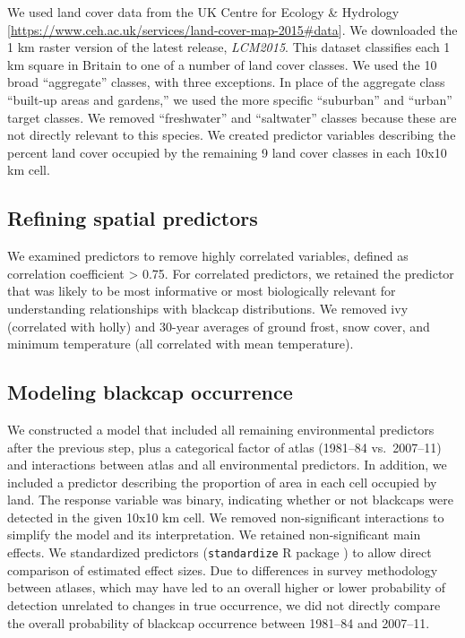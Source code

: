 \documentclass[a4paper, twoside]{templates/ociamthesis}
\begin{document}
We used land cover data from the UK Centre for Ecology \& Hydrology {[}\url{https://www.ceh.ac.uk/services/land-cover-map-2015\#data}{]}. We downloaded the 1 km raster version of the latest release, \emph{LCM2015}. This dataset classifies each 1 km square in Britain to one of a number of land cover classes. We used the 10 broad ``aggregate'' classes, with three exceptions. In place of the aggregate class ``built-up areas and gardens,'' we used the more specific ``suburban'' and ``urban'' target classes. We removed ``freshwater'' and ``saltwater'' classes because these are not directly relevant to this species. We created predictor variables describing the percent land cover occupied by the remaining 9 land cover classes in each 10x10 km cell.

\hypertarget{refining-spatial-predictors}{%
\subsection{Refining spatial predictors}\label{refining-spatial-predictors}}

We examined predictors to remove highly correlated variables, defined as correlation coefficient \textgreater{} 0.75. For correlated predictors, we retained the predictor that was likely to be most informative or most biologically relevant for understanding relationships with blackcap distributions. We removed ivy (correlated with holly) and 30-year averages of ground frost, snow cover, and minimum temperature (all correlated with mean temperature).

\hypertarget{modeling-blackcap-occurrence}{%
\subsection{Modeling blackcap occurrence}\label{modeling-blackcap-occurrence}}

We constructed a model that included all remaining environmental predictors after the previous step, plus a categorical factor of atlas (1981--84 vs.~2007--11) and interactions between atlas and all environmental predictors. In addition, we included a predictor describing the proportion of area in each cell occupied by land.
The response variable was binary, indicating whether or not blackcaps were detected in the given 10x10 km cell. We removed non-significant interactions to simplify the model and its interpretation. We retained non-significant main effects. We standardized predictors (\texttt{standardize} R package \autocite{eagerStandardizeToolsStandardizing2017}) to allow direct comparison of estimated effect sizes. Due to differences in survey methodology between atlases, which may have led to an overall higher or lower probability of detection unrelated to changes in true occurrence, we did not directly compare the overall probability of blackcap occurrence between 1981--84 and 2007--11.
\end{document}
